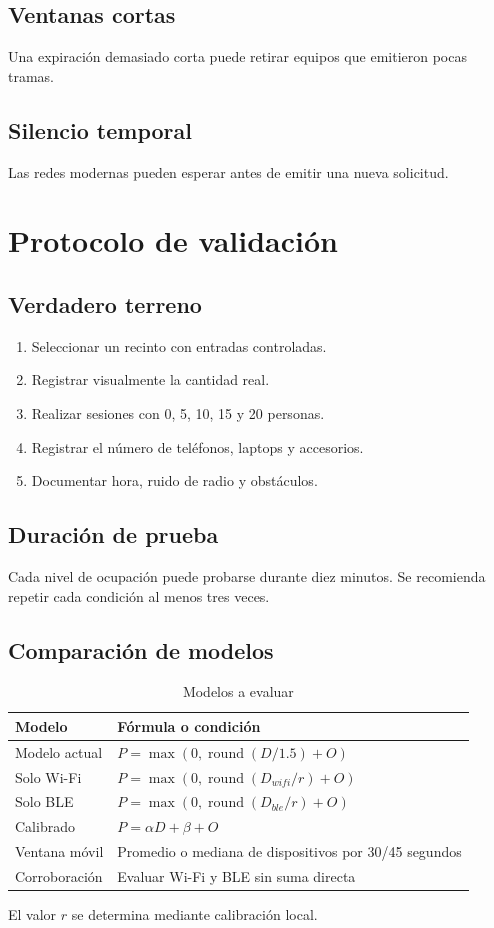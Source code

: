 \documentclass[12pt,a4paper]{article}
\begin{document}
\subsection{Ventanas cortas}
Una expiración demasiado corta puede retirar equipos que emitieron pocas tramas.

\subsection{Silencio temporal}
Las redes modernas pueden esperar antes de emitir una nueva solicitud.

\section{Protocolo de validación}
\subsection{Verdadero terreno}
\begin{enumerate}
\item Seleccionar un recinto con entradas controladas.
\item Registrar visualmente la cantidad real.
\item Realizar sesiones con 0, 5, 10, 15 y 20 personas.
\item Registrar el número de teléfonos, laptops y accesorios.
\item Documentar hora, ruido de radio y obstáculos.
\end{enumerate}

\subsection{Duración de prueba}
Cada nivel de ocupación puede probarse durante diez minutos. Se recomienda repetir cada condición al menos tres veces.

\subsection{Comparación de modelos}
\begin{table}[htbp]
\centering
\centering
\caption{Modelos a evaluar}
\begin{tabularx}{\textwidth}{@{}p{3.4cm}X@{}}
\toprule
Modelo & Fórmula o condición \\
\midrule
Modelo actual & $P=\max(0,\operatorname{round}(D/1.5)+O)$ \\
Solo Wi-Fi & $P=\max(0,\operatorname{round}(D_{wifi}/r)+O)$ \\
Solo BLE & $P=\max(0,\operatorname{round}(D_{ble}/r)+O)$ \\
Calibrado & $P=\alpha D+\beta+O$ \\
Ventana móvil & Promedio o mediana de dispositivos por 30/45 segundos \\
Corroboración & Evaluar Wi-Fi y BLE sin suma directa \\
\bottomrule
\end{tabularx}
\end{table}
El valor $r$ se determina mediante calibración local.
\end{document}
